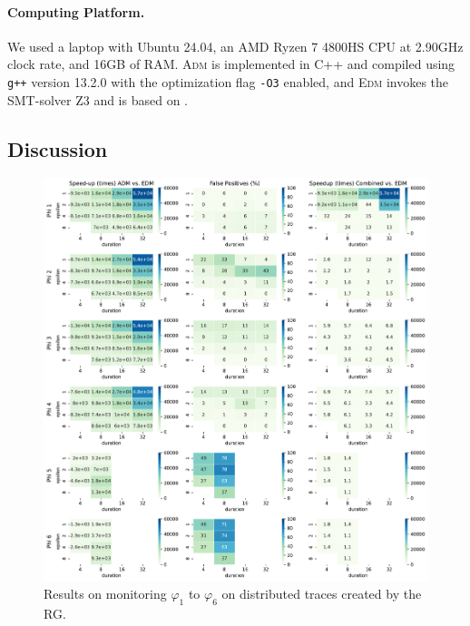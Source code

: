 \paragraph*{Computing Platform.}
We used a laptop with Ubuntu 24.04, an AMD Ryzen 7 4800HS CPU at 2.90GHz clock rate, and 16GB of RAM.
\textsc{Adm} is implemented in C++ and compiled using \texttt{g++} version 13.2.0 with the optimization flag \texttt{-O3} enabled, and \textsc{Edm} invokes the SMT-solver Z3 \cite{MouraB08} and is based on \cite{MomtazAB23}.

\subsection{Discussion}

\begin{figure}[t]
	\begin{center}
		\includegraphics[width=\linewidth]{speedup_all}
		\caption{Results on monitoring $\varphi_{1}$ to $\varphi_{6}$ on distributed traces created by the RG.}
		\label{fig:rgresults}
	\end{center}
\end{figure}


